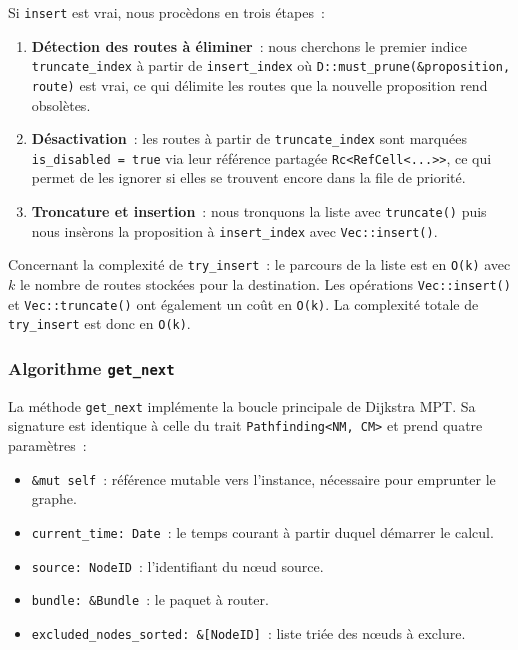 \documentclass{article}
\begin{document}
Si \texttt{insert} est vrai, nous procèdons en trois étapes~:
\begin{enumerate}
    \item \textbf{Détection des routes à éliminer}~: nous cherchons le premier indice \texttt{truncate\_index}
    à partir de \texttt{insert\_index} où \texttt{D::must_prune(&proposition, route)} est vrai,
    ce qui délimite les routes que la nouvelle proposition rend obsolètes.
    \item \textbf{Désactivation}~: les routes à partir de \texttt{truncate\_index} sont marquées
    \texttt{is_disabled = true} via leur référence partagée \texttt{Rc<RefCell<...>>},
    ce qui permet de les ignorer si elles se trouvent encore dans la file de priorité.
    \item \textbf{Troncature et insertion}~: nous tronquons la liste avec \texttt{truncate()}
    puis nous insèrons la proposition à \texttt{insert\_index} avec \texttt{Vec::insert()}.
\end{enumerate}

Concernant la complexité de \texttt{try\_insert}~: le parcours de la liste est en \texttt{O(k)}
avec $k$ le nombre de routes stockées pour la destination. Les opérations \texttt{Vec::insert()}
et \texttt{Vec::truncate()} ont également un coût en \texttt{O(k)}. La complexité totale
de \texttt{try\_insert} est donc en \texttt{O(k)}.

\subsubsection*{Algorithme \texttt{get\_next}}

La méthode \texttt{get\_next} implémente la boucle principale de Dijkstra MPT. Sa signature
est identique à celle du trait \texttt{Pathfinding<NM, CM>} et prend quatre paramètres~:
\begin{itemize}
    \item \texttt{\&mut self}~: référence mutable vers l'instance, nécessaire pour emprunter le graphe.
    \item \texttt{current\_time: Date}~: le temps courant à partir duquel démarrer le calcul.
    \item \texttt{source: NodeID}~: l'identifiant du nœud source.
    \item \texttt{bundle: \&Bundle}~: le paquet à router.
    \item \texttt{excluded\_nodes\_sorted: \&[NodeID]}~: liste triée des nœuds à exclure.
\end{itemize}
\end{document}
